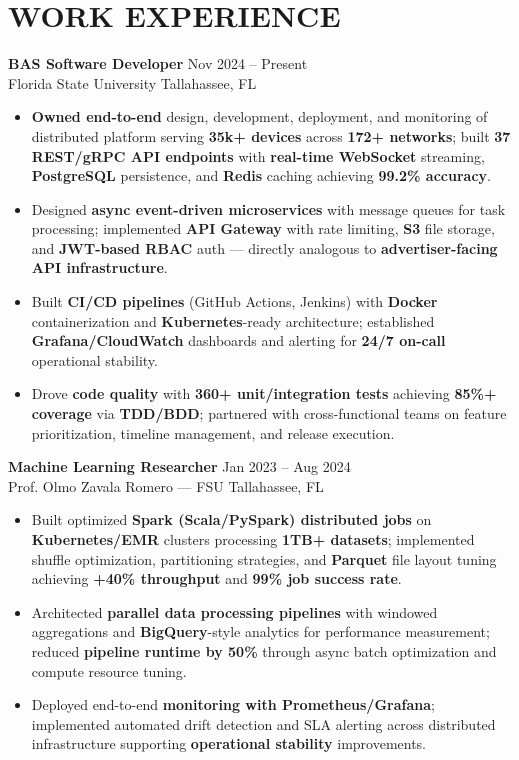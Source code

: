 \documentclass[letterpaper,10pt]{article}
\newcommand{\resumeItem}[1]{\item\small #1}
\newcommand{\resumeSubheading}[4]{
  \vspace{6pt}
  \noindent
  \textbf{#1} \hfill {\footnotesize #2} \\
  [-1pt]
  \noindent
  \small #3 \hfill {\small #4}
  \vspace{3pt}
}
\newcommand{\resumeItemsStart}{\vspace{-2pt}\begin{itemize}}
\newcommand{\resumeItemsEnd}{\end{itemize}\vspace{6pt}}
\begin{document}
\section{\textcolor{metablue}{WORK EXPERIENCE}}
\vspace{-12pt}

\resumeSubheading
{BAS Software Developer}{Nov 2024 -- Present}
{Florida State University}{Tallahassee, FL}
\resumeItemsStart
\resumeItem{\textbf{Owned end-to-end} design, development, deployment, and monitoring of distributed platform serving \textbf{35k+ devices} across \textbf{172+ networks}; built \textbf{37 REST/gRPC API endpoints} with \textbf{real-time WebSocket} streaming, \textbf{PostgreSQL} persistence, and \textbf{Redis} caching achieving \textbf{99.2\% accuracy}.}
\resumeItem{Designed \textbf{async event-driven microservices} with message queues for task processing; implemented \textbf{API Gateway} with rate limiting, \textbf{S3} file storage, and \textbf{JWT-based RBAC} auth --- directly analogous to \textbf{advertiser-facing API infrastructure}.}
\resumeItem{Built \textbf{CI/CD pipelines} (GitHub Actions, Jenkins) with \textbf{Docker} containerization and \textbf{Kubernetes}-ready architecture; established \textbf{Grafana/CloudWatch} dashboards and alerting for \textbf{24/7 on-call} operational stability.}
\resumeItem{Drove \textbf{code quality} with \textbf{360+ unit/integration tests} achieving \textbf{85\%+ coverage} via \textbf{TDD/BDD}; partnered with cross-functional teams on feature prioritization, timeline management, and release execution.}
\resumeItemsEnd
\vspace{-12pt}

\resumeSubheading
{Machine Learning Researcher}{Jan 2023 -- Aug 2024}
{Prof. Olmo Zavala Romero — FSU}{Tallahassee, FL}
\resumeItemsStart
\resumeItem{Built optimized \textbf{Spark (Scala/PySpark) distributed jobs} on \textbf{Kubernetes/EMR} clusters processing \textbf{1TB+ datasets}; implemented shuffle optimization, partitioning strategies, and \textbf{Parquet} file layout tuning achieving \textbf{+40\% throughput} and \textbf{99\% job success rate}.}
\resumeItem{Architected \textbf{parallel data processing pipelines} with windowed aggregations and \textbf{BigQuery}-style analytics for performance measurement; reduced \textbf{pipeline runtime by 50\%} through async batch optimization and compute resource tuning.}
\resumeItem{Deployed end-to-end \textbf{monitoring with Prometheus/Grafana}; implemented automated drift detection and SLA alerting across distributed infrastructure supporting \textbf{operational stability} improvements.}
\resumeItemsEnd
\vspace{-12pt}
\end{document}

